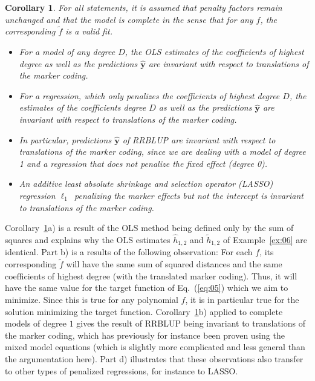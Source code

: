 \documentclass{bmcart}
\newtheorem{corollary}{Corollary}
\newcommand{\0}{\mathbf{0}}
\newcommand{\y}{\mathbf{y}}
\begin{document}
\begin{corollary}\label{cor:01}
	For all statements, it is assumed that penalty factors remain unchanged and that the model is complete in the sense that for any $f$, the corresponding $\tilde{f}$ is a valid fit.
	\begin{itemize}
\item [a)] 	For a model of any degree $D$, the OLS estimates of the coefficients of highest degree as well as the predictions $\hat{\y}$ are invariant with respect to translations of the marker coding.
		\item [b)] For a regression, which only penalizes the coefficients of highest degree $D$, the estimates of the coefficients degree $D$ as well as the predictions $\hat{\y}$ are invariant with respect to translations of the marker coding.
		\item[c)] 	In particular, predictions $\hat{\y}$ of RRBLUP are invariant with respect to translations of the marker coding, since we are dealing with a model of degree 1 and a regression that does not penalize the fixed effect (degree 0).
		\item[d)] An additive least absolute shrinkage and selection operator (LASSO) regression $\ell_1$~penalizing the marker effects but not the intercept is invariant to translations of the marker coding. 

	\end{itemize}
\end{corollary}
Corollary~\ref{cor:01}a) is a result of the OLS method being defined only by the sum of squares and explains why the OLS estimates $\hat{h}_{1,2}$ and $\tilde{h}_{1,2}$ of Example~\ref{ex:06} are identical. Part b) is a results of the following observation: For each $f$, its corresponding $\tilde{f}$ will have the same sum of squared distances and the same coefficients of highest degree (with the translated marker coding). Thus, it will have the same value for the target function of Eq.~(\ref{eq:05}) which we aim to minimize.
Since this is true for any polynomial $f$, it is in particular true for the solution minimizing the target function.
Corollary~\ref{cor:01}b) applied to complete models of degree $1$ gives the result of RRBLUP being invariant to translations of the marker coding, which has previously for instance been proven using the mixed model equations \cite{Martini17} (which is slightly more complicated and less general than the argumentation here). Part d) illustrates that these observations also transfer to other types of penalized regressions, for instance to LASSO. 
\end{document}
